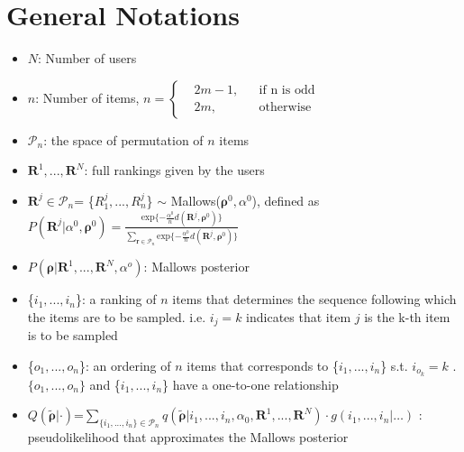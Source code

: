 \documentclass[11pt, oneside]{article}   	%
\title{}
\author{}
\date{}							%
\begin{document}
\maketitle 
\section{General Notations}

\begin{itemize}

	\item {$N$: Number of users}
	
	\item {$n$: Number of items,    $
	n = \left \{
	\begin{aligned}
	&2m-1, && \text{if n is odd} \\
	&2m, && \text{otherwise}
	\end{aligned} \right.
	$}
	
	\item{$\mathcal{P}_n$: the space of permutation of $n$ items}
	\item {$\bm{R}^1,...,\bm{R}^N$: full rankings given by the users}
	
	
	\item {$\bm{R}^j \in \mathcal{P}_n$= \{$R^j_1,...,R^j_n$\} $\sim$ Mallows($\bm{\rho}^0, \alpha^0$), defined as 
	$P(\bm{R}^j|\alpha^0, \bm{\rho}^0) = \frac{\text{exp}\{-\frac{\alpha^0}{n}d(\bm{R}^j, \bm{\rho}^0)\}}{\sum\limits_{\bm{r}\in \mathcal{P}_n}\text{exp}\{-\frac{\alpha^0}{n}d(\bm{R}^j, \bm{\rho}^0)\}}$}
	
	
	\item {$P(\bm{\rho}|\bm{R}^1,...,\bm{R}^N,\alpha^o)$: Mallows posterior}
	
	
	\item{\{$i_1, ..., i_n$\}: a ranking of $n$ items that determines the sequence following which the items are to be sampled. i.e. $i_j = k$ indicates that item $j$ is the k-th item is to be sampled}
	
	\item{ \{$o_1, ..., o_n$\}: an ordering of $n$ items that corresponds to \{$i_1, ..., i_n$\} s.t. $i_{o_k} = k$ }. $\{o_1, ...,o_n\}$ and \{$i_1, ..., i_n$\} have a one-to-one relationship
	
	\item {$Q(\tilde{\bm{\rho}}|\cdot)$=$\sum\limits_{\{i_1, ..., i_n \}\in \mathcal{P}_n }q(\tilde{\bm{\rho}}|i_1, ..., i_n, \alpha_0, \bm{R}^1, ...,\bm{R}^N) \cdot g(i_1, ..., i_n| \dots)$ : pseudolikelihood that approximates the Mallows posterior}
	

\end{itemize}
\end{document}

